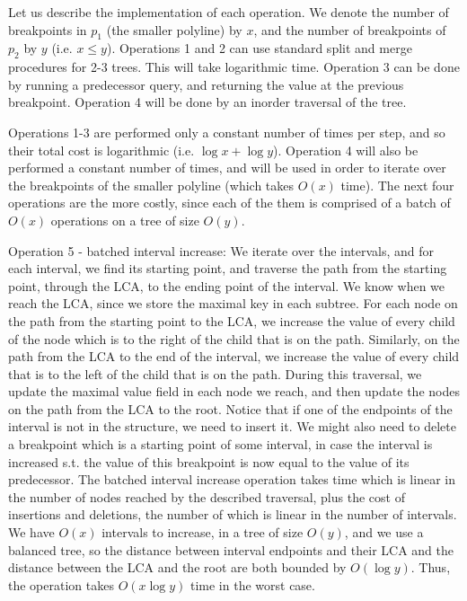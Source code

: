 \documentclass[11pt,a4paper]{article}
\theoremstyle{definition}
\theoremstyle{remark}
\begin{document}
Let us describe the implementation of each operation. We denote the number of breakpoints in $p_1$ (the smaller polyline) by $x$, and the number of breakpoints of $p_2$ by $y$ (i.e. $x \leq y$). Operations 1 and 2 can use standard split and merge procedures for 2-3 trees. This will take logarithmic time. Operation 3 can be done by running a predecessor query, and returning the value at the previous breakpoint. Operation 4 will be done by an inorder traversal of the tree.

Operations 1-3 are performed only a constant number of times per step, and so their total cost is logarithmic (i.e. $\log x + \log y$). Operation 4 will also be performed a constant number of times, and will be used in order to iterate over the breakpoints of the smaller polyline (which takes $O(x)$ time). The next four operations are the more costly, since each of the them is comprised of a batch of $O(x)$ operations on a tree of size $O(y)$.

Operation 5 - batched interval increase: We iterate over the intervals, and for each interval, we find its starting point, and traverse the path from the starting point, through the LCA, to the ending point of the interval. We know when we reach the LCA, since we store the maximal key in each subtree. For each node on the path from the starting point to the LCA, we increase the value of every child of the node which is to the right of the child that is on the path. Similarly, on the path from the LCA to the end of the interval, we increase the value of every child that is to the left of the child that is on the path. During this traversal, we update the maximal value field in each node we reach, and then update the nodes on the path from the LCA to the root. Notice that if one of the endpoints of the interval is not in the structure, we need to insert it. We might also need to delete a breakpoint which is a starting point of some interval, in case the interval is increased  s.t. the value of this breakpoint is now equal to the value of its predecessor. The batched interval increase operation takes time which is linear in the number of nodes reached by the described traversal, plus the cost of insertions and deletions, the number of which is linear in the number of intervals. We have $O(x)$ intervals to increase, in a tree of size $O(y)$, and we use a balanced tree, so the distance between interval endpoints and their LCA and the distance between the LCA and the root are both bounded by $O(\log y)$. Thus, the operation takes $O(x \log y)$ time in the worst case.
\end{document}
